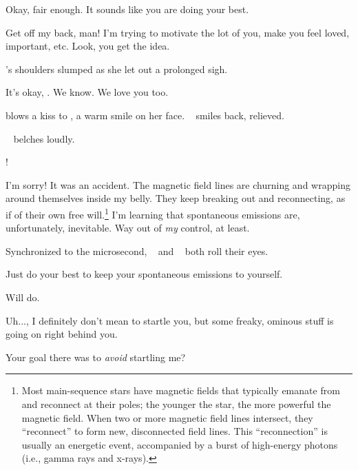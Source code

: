 \documentclass[main.tex]{subfiles}
\begin{document}
\par \Sterope Okay, fair enough.  It sounds like you are doing your best.

\par \Maia Get off my back, man!  I'm trying to motivate the lot of you, make you feel loved, important, etc.  Look, you get the idea. 

\par \nar \rmmaia's shoulders slumped as she let out a prolonged sigh.

\par \Sterope It's okay, \rmmaia.  We know.  We love you too.

\par \nar \rmsterope blows a kiss to \rmmaia, a warm smile on her face.  \rmmaia~ smiles back, relieved.

\par \nar \rmalcyone~ belches loudly.

\par \Sterope \rmalcyone!

\par \Alcyone I'm sorry!  It was an accident.  The magnetic field lines are churning and wrapping around themselves inside my belly.  They keep breaking out and reconnecting, as if of their own free will.\footnote{Most main-sequence stars have magnetic fields that typically emanate from and reconnect at their poles; the younger the star, the more powerful the magnetic field.  When two or more magnetic field lines intersect, they ``reconnect'' to form new, disconnected field lines.  This ``reconnection'' is usually an energetic event, accompanied by a burst of high-energy photons (i.e., gamma rays and x-rays).}   I'm learning that spontaneous emissions are, unfortunately, inevitable.  Way out of \textit{my} control, at least.

\par \nar Synchronized to the microsecond, \rmmaia~ and \rmsterope~ both roll their eyes.

\par \Maia Just do your best to keep your spontaneous emissions to yourself.

\par \Alcyone Will do. 

\par \Electra Uh...\rmmaia, I definitely don't mean to startle you, but some freaky, ominous stuff is going on right behind you.

\par \Maia Your goal there was to \textit{avoid} startling me?
\end{document}
